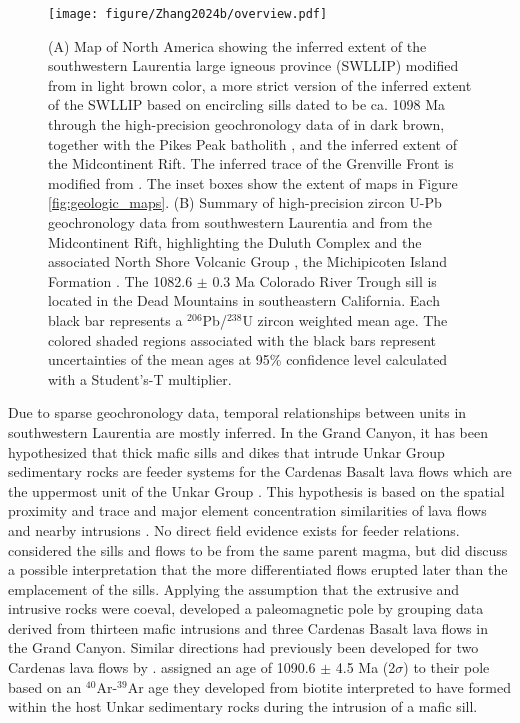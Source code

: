 \begin{figure}[h!]
\centering
\texttt{[image: figure/Zhang2024b/overview.pdf]}
\caption{ (A) Map of North America showing the inferred extent of the southwestern Laurentia large igneous province (SWLLIP) modified from  in light brown color, a more strict version of the inferred extent of the SWLLIP based on encircling sills dated to be ca. 1098 Ma through the high-precision geochronology data of  in dark brown, together with the Pikes Peak batholith \cite{Green1992b}, and the inferred extent of the Midcontinent Rift. The inferred trace of the Grenville Front is modified from . The inset boxes show the extent of maps in Figure \ref{fig:geologic_maps}. (B) Summary of high-precision zircon U-Pb geochronology data from southwestern Laurentia \cite{Mohr2024a} and from the Midcontinent Rift, highlighting the Duluth Complex and the associated North Shore Volcanic Group \cite{Swanson-Hysell2019a, Swanson-Hysell2021a}, the Michipicoten Island Formation \cite{Fairchild2017a}. The 1082.6 $\pm$ 0.3 Ma Colorado River Trough sill is located in the Dead Mountains in southeastern California. Each black bar represents a $^{206}$Pb/$^{238}$U zircon weighted mean age. The colored shaded regions associated with the black bars represent uncertainties of the mean ages at 95\% confidence level calculated with a Student's-T multiplier.}
\label{fig:overview}
\end{figure}
    
Due to sparse geochronology data, temporal relationships between units in southwestern Laurentia are mostly inferred. In the Grand Canyon, it has been hypothesized that thick mafic sills and dikes that intrude Unkar Group sedimentary rocks are feeder systems for the Cardenas Basalt lava flows which are the uppermost unit of the Unkar Group \cite[e.g.][]{Hammond1990a, Timmons2005a}. This hypothesis is based on the spatial proximity and trace and major element concentration similarities of lava flows and nearby intrusions \cite{Larson1994a}. No direct field evidence exists for feeder relations.  considered the sills and flows to be from the same parent magma, but did discuss a possible interpretation that the more differentiated flows erupted later than the emplacement of the sills. Applying the assumption that the extrusive and intrusive rocks were coeval,  developed a paleomagnetic pole by grouping data derived from thirteen mafic intrusions and three Cardenas Basalt lava flows in the Grand Canyon. Similar directions had previously been developed for two Cardenas lava flows by .  assigned an age of 1090.6 $\pm$ 4.5 Ma (2$\sigma$) to their pole based on an $^{40}$Ar-$^{39}$Ar age they developed from biotite interpreted to have formed within the host Unkar sedimentary rocks during the intrusion of a mafic sill. 

